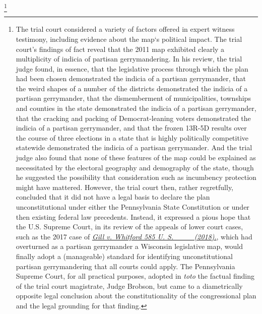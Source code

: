         \footnote{The trial court considered a variety of factors offered in expert witness testimony, including evidence about the map‘s political impact. The trial court’s findings of fact reveal that the 2011 map exhibited clearly a multiplicity of indicia of partisan gerrymandering. In his review, the trial judge found, in essence, that the legislative process through which the plan had been chosen demonstrated the indicia of a partisan gerrymander, that the weird shapes of a number of the districts demonstrated the indicia of a partisan gerrymander, that the dismemberment of municipalities, townships and counties in the state demonstrated the indicia of a partisan gerrymander, that the cracking and packing of Democrat-leaning voters demonstrated the indicia of a partisan gerrymander, and that the frozen 13R-5D results over the course of three elections in a state that is highly politically competitive statewide demonstrated the indicia of a partisan gerrymander. And the trial judge also found that none of these features of the map could be explained as necessitated by the electoral geography and demography of the state, though he suggested the possibility that consideration such as incumbency protection might have mattered. However, the trial court then, rather regretfully, concluded that it did not have a legal basis to declare the plan unconstitutional under either the Pennsylvania State Constitution or under then existing federal law precedents. Instead, it expressed a pious hope that the U.S. Supreme Court, in its review of the appeals of lower court cases, such as the 2017 case of \href{https://www.brennancenter.org/sites/default/files/legal-work/16-1161_Opinion.pdf}{\textit{Gill v. Whitford 585 U. S. \_\_\_ (2018)}.}, which had overturned as a partisan gerrymander a Wisconsin legislative map, would finally adopt a (manageable) standard for identifying unconstitutional partisan gerrymandering that all courts could apply. The Pennsylvania Supreme Court, for all practical purposes, adopted in \textit{toto} the factual finding of the trial court magistrate, Judge Brobson, but came to a diametrically opposite legal conclusion about the constitutionality of the congressional plan and the legal grounding for that finding.}
\par
